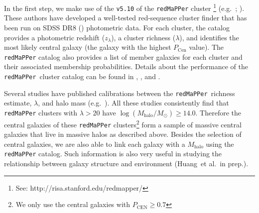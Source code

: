 \documentclass[a4paper,fleqn,usenatbib]{mnras}
\def\etal{{\ et al.~}}
\def\redm{\texttt{redMaPPer}}
\def\mhalo{{$M_{\mathrm{halo}}$}}
\begin{document}
    In the first step, we make use of the \texttt{v5.10} of the \redm{} cluster 
    \footnote{See: http://risa.stanford.edu/redmapper/} 
    (e.g.\ \citealt{Rykoff2014}; \citealt{Rozo2015b}). 
    These authors have developed a well-tested red-sequence cluster finder that has 
    been run on SDSS DR8 (\citealt{SDSSDR8}) photometric data. 
    For each cluster, the catalog provides a photometric redshift ($z_{\lambda}$), a 
    cluster richness ($\lambda$), and identifies the most likely central galaxy (the 
    galaxy with the highest $P_{\mathrm{Cen}}$ value). 
    The \redm{}{} catalog also provides a list of member galaxies for each cluster and 
    their associated membership probabilities. 
    Details about the performance of the \redm{}~cluster catalog can be found in 
    \citet{Rozo2014}, \citet{Rozo2015a}, and \citet{Rozo2015b}. 
    
    Several studies have published calibrations between the \redm{}~richness estimate, 
    $\lambda$, and halo mass (e.g.\ \citealt{Saro2015, Farahi2016, Simet2016, 
    Melchior2016}). 
    All these studies consistently find that \redm{} clusters with $\lambda > 20$ 
    have $\log (M_{\mathrm{halo}}/M_{\odot}) \geq 14.0$. 
    Therefore the central galaxies of these \redm{} clusters\footnote{We only use the 
    central galaxies with $P_{\mathrm{CEN}} \geq 0.7$} form a sample of massive central 
    galaxies that live in massive halos as described above.
    Besides the selection of central galaxies, we are also able to link each galaxy
    with a \mhalo{} using the \redm{} catalog. 
    Such information is also very useful in studying the relationship between galaxy
    structure and environment (Huang\etal in prep.).
\end{document}

